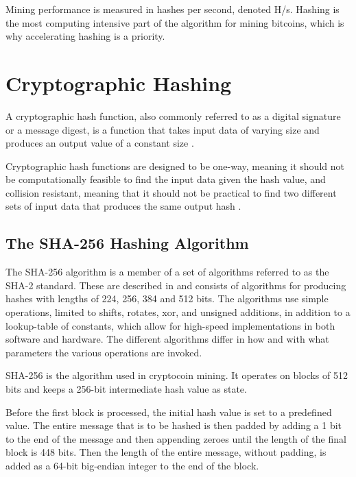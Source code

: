 Mining performance is measured in hashes per second, denoted H/s. Hashing is the
most computing intensive part of the algorithm for mining bitcoins, which is
why accelerating hashing is a priority.

\section{Cryptographic Hashing}

A cryptographic hash function, also commonly referred to as a digital signature or
a message digest, is a function that takes input data of varying size and
produces an output value of a constant size \cite{hashing-overview}.

Cryptographic hash functions are designed to be one-way, meaning it should
not be computationally feasible to find the input data given the hash value,
and collision resistant, meaning that it should not be practical to find two
different sets of input data that produces the same output hash \cite{sha-spec}.

\subsection{The SHA-256 Hashing Algorithm}
\label{sec:hashing-algo}

The SHA-256 algorithm is a member of a set of algorithms referred to as the SHA-2 standard.
These are described in \cite{fips180-4} and consists of algorithms for producing hashes with lengths of 224, 256, 384 and 512 bits.
The algorithms use simple operations, limited to shifts, rotates, xor, and unsigned additions,
in addition to a lookup-table of constants, which allow for high-speed implementations in both
software and hardware. The different algorithms differ in how and with what parameters the various
operations are invoked.

SHA-256 is the algorithm used in cryptocoin mining. It operates on blocks of 512 bits
and keeps a 256-bit intermediate hash value as state.

Before the first block is processed, the initial hash value is set to a predefined
value. The entire message that is to be hashed is then padded by adding a 1 bit to
the end of the message and then appending zeroes until the length of the final block
is 448 bits. Then the length of the entire message, without padding, is added as a
64-bit big-endian integer to the end of the block.

